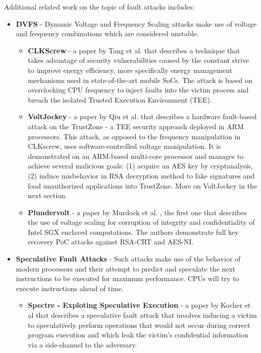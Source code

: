 Additional related work on the topic of fault attacks includes:

\begin{itemize}

	\item \textbf{DVFS} - Dynamic Voltage and Frequency Scaling 
	attacks make use of voltage and frequency combinations
	which are considered unstable.

	\begin{itemize}

		\item \textbf{CLKScrew} - a paper by 
		Tang et al. \cite{tang2017clkscrew} that describes a technique that takes advantage of security vulnerabilities
		caused by the constant strive to improve energy efficiency, more specifically energy management
		mechanisms used in state-of-the-art mobile SoCs.
		The attack is based on overclocking CPU frequency to inject faults into the victim process and breach the isolated Trusted Execution Environment (TEE).

		\item \textbf{VoltJockey} - a paper by Qiu et al. \cite{qiu2019voltjockey} that describes a hardware fault-based attack on 
		the TrustZone - a TEE security approach deployed in ARM processors.
		This attack, as opposed to the frequency manipulation in CLKscrew,
		uses software-controlled voltage manipulation.
		It is demonstrated on an ARM-based multi-core processor and manages to achieve several malicious goals: (1) acquire an AES key by cryptanalysis, (2) induce misbehavior in RSA decryption method to fake signatures and load unauthorized applications into TrustZone. More on VoltJockey in the next section.
		
		\item \textbf{Plundervolt} - a paper by Murdock et al. \cite{murdock2020plundervolt}, the first one that describes 
		the use of voltage scaling for corruption of integrity and confidentiality
		of Intel SGX enclaved computations. The authors demonstrate full key recovery PoC attacks
		against RSA-CRT and AES-NI.
		
		
	\end{itemize}

	\item \textbf{Speculative Fault Attacks} - Such attacks make use of the behavior of modern
	processors and their attempt to predict and speculate the next instructions to be executed
	for maximum performance. CPUs will try to execute instructions ahead of time.

	\begin{itemize}

		\item \textbf{Spectre - Exploting Speculative Execution} - a paper by Kocher et al that describes
		a speculative fault attack that involves inducing a victim to speculatively perform operations
		that would not occur during correct program execution and which leak the victim's confidential
		information via a side-channel to the adversary.
		
	\end{itemize}

\end{itemize}

